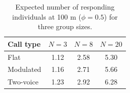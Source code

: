 \begin{table}[H]
\centering
\caption{Expected number of responding individuals at 100 m ($\phi=0.5$) for three group sizes.}
\label{tab:p4group}
\small
\begin{tabular}{lccc}
\toprule
Call type & $N=3$ & $N=8$ & $N=20$ \\
\midrule
Flat & 1.12 & 2.58 & 5.30 \\
Modulated & 1.16 & 2.71 & 5.66 \\
Two-voice & 1.23 & 2.92 & 6.28 \\
\bottomrule
\end{tabular}
\end{table}